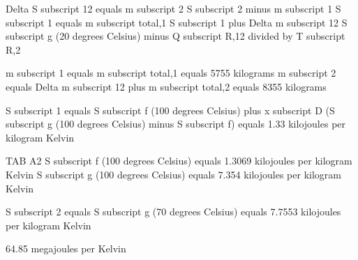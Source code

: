 Delta S subscript 12 equals m subscript 2 S subscript 2 minus m subscript 1 S subscript 1 equals m subscript total,1 S subscript 1 plus Delta m subscript 12 S subscript g (20 degrees Celsius) minus Q subscript R,12 divided by T subscript R,2  

m subscript 1 equals m subscript total,1 equals 5755 kilograms  
m subscript 2 equals Delta m subscript 12 plus m subscript total,2 equals 8355 kilograms  

S subscript 1 equals S subscript f (100 degrees Celsius) plus x subscript D (S subscript g (100 degrees Celsius) minus S subscript f) equals 1.33 kilojoules per kilogram Kelvin  

TAB A2  
S subscript f (100 degrees Celsius) equals 1.3069 kilojoules per kilogram Kelvin  
S subscript g (100 degrees Celsius) equals 7.354 kilojoules per kilogram Kelvin  

S subscript 2 equals S subscript g (70 degrees Celsius) equals 7.7553 kilojoules per kilogram Kelvin  

64.85 megajoules per Kelvin